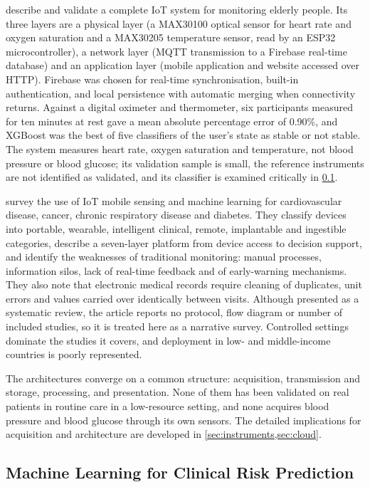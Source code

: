 \Textcite{efendi2025} describe and validate a complete IoT system for monitoring elderly people. Its three layers are a physical layer (a MAX30100 optical sensor for heart rate and oxygen saturation and a MAX30205 temperature sensor, read by an ESP32 microcontroller), a network layer (MQTT transmission to a Firebase real-time database) and an application layer (mobile application and website accessed over HTTP). Firebase was chosen for real-time synchronisation, built-in authentication, and local persistence with automatic merging when connectivity returns. Against a digital oximeter and thermometer, six participants measured for ten minutes at rest gave a mean absolute percentage error of 0.90\%, and XGBoost was the best of five classifiers of the user's state as stable or not stable. The system measures heart rate, oxygen saturation and temperature, not blood pressure or blood glucose; its validation sample is small, the reference instruments are not identified as validated, and its classifier is examined critically in \cref{sec:lr-ml}.

\Textcite{liu2025review} survey the use of IoT mobile sensing and machine learning for cardiovascular disease, cancer, chronic respiratory disease and diabetes. They classify devices into portable, wearable, intelligent clinical, remote, implantable and ingestible categories, describe a seven-layer platform from device access to decision support, and identify the weaknesses of traditional monitoring: manual processes, information silos, lack of real-time feedback and of early-warning mechanisms. They also note that electronic medical records require cleaning of duplicates, unit errors and values carried over identically between visits. Although presented as a systematic review, the article reports no protocol, flow diagram or number of included studies, so it is treated here as a narrative survey. Controlled settings dominate the studies it covers, and deployment in low- and middle-income countries is poorly represented.

The architectures converge on a common structure: acquisition, transmission and storage, processing, and presentation. None of them has been validated on real patients in routine care in a low-resource setting, and none acquires blood pressure and blood glucose through its own sensors. The detailed implications for acquisition and architecture are developed in \cref{sec:instruments,sec:cloud}.

\subsection{Machine Learning for Clinical Risk Prediction}\label{sec:lr-ml}

